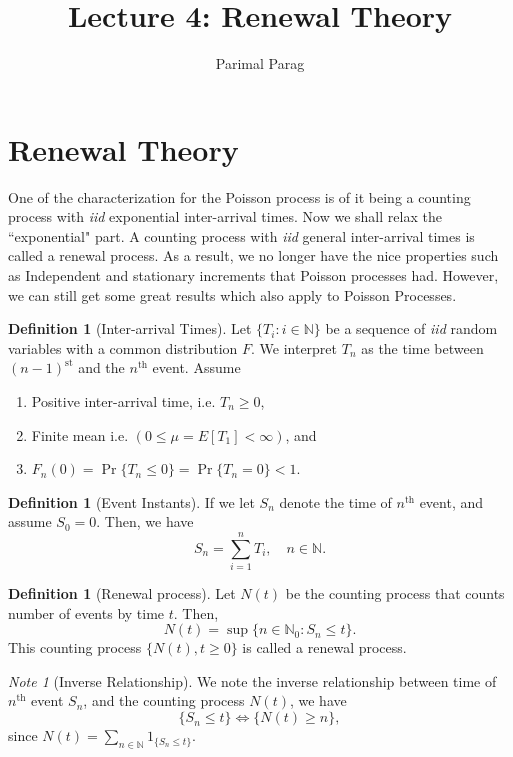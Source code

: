 \documentclass[a4paper,10pt]{article}
\date{}
\title{Lecture 4: Renewal Theory}
\author{Parimal Parag}
\theoremstyle{plain}
\theoremstyle{definition}
\newtheorem{defn}[thm]{Definition}
\theoremstyle{remark}
\newtheorem{note}[thm]{Note}
\begin{document}
\maketitle

\section{Renewal Theory}
One of the characterization for the Poisson process is of it being a counting process with \emph{iid} exponential inter-arrival times. Now we shall relax the ``exponential" part. A counting process with \emph{iid} general inter-arrival times is called a renewal process.
As a result, we no longer have the nice properties such as Independent and stationary increments that Poisson processes had. However, we can still get some great results which also apply to Poisson Processes. 

\begin{defn}[Inter-arrival Times]Let $\{T_i: i \in \mathbb{N}\}$ be a sequence of \emph{iid} random variables with a common distribution $F$. We interpret $T_n$ as the time between $(n - 1)^{\mathrm{st}}$ and the $n^{\mathrm{th}}$ event. Assume 
\begin{enumerate}
  \item Positive inter-arrival time, i.e. $T_n \geq 0$,
	\item Finite mean i.e. $(0 \leq \mu = E[T_1] < \infty)$, and
	\item $F_n(0) = \Pr\{T_n \leq 0\} = \Pr\{T_n = 0\} < 1$.
\end{enumerate}
\end{defn}

\begin{defn}[Event Instants] If we let $S_n$ denote the time of $n^{\mathrm{th}}$ event, and assume $S_0 = 0$. Then, we have
\begin{equation*} 
S_n = \sum_{i=1}^n T_i, \quad n\in \mathbb{N}. 
\end{equation*}
\end{defn}

\begin{defn}[Renewal process] Let $N(t)$ be the counting process that counts number of events by time $t$. Then,
\begin{equation*} 
N(t) = \sup\{n \in \mathbb{N}_0 : S_n \leq t\}.
\end{equation*} 
This counting process $\{N(t), t \geq 0\}$ is called a renewal process.
\end{defn}
\begin{note}[Inverse Relationship]
We note the inverse relationship between time of $n^{\mathrm{th}}$ event $S_n$, and the counting process $N(t)$, we have 
\begin{equation}
\label{eq:InverseRelationship}
\{S_n \leq t\} \iff \{N(t) \geq n\},
\end{equation}
since $N(t) = \sum_{n \in \mathbb{N}}1_{\{S_n \leq t\}}$.
\end{note}
\end{document}
